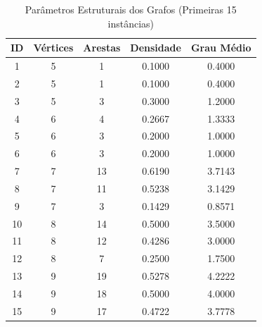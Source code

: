 \begin{table}
\centering
\caption{Parâmetros Estruturais dos Grafos (Primeiras 15 instâncias)}
\label{tab:parametros_grafos_2}
\begin{tabular}{ccccc}
\toprule
ID & Vértices & Arestas & Densidade & Grau Médio \\
\midrule
1 & 5 & 1 & 0.1000 & 0.4000 \\
2 & 5 & 1 & 0.1000 & 0.4000 \\
3 & 5 & 3 & 0.3000 & 1.2000 \\
4 & 6 & 4 & 0.2667 & 1.3333 \\
5 & 6 & 3 & 0.2000 & 1.0000 \\
6 & 6 & 3 & 0.2000 & 1.0000 \\
7 & 7 & 13 & 0.6190 & 3.7143 \\
8 & 7 & 11 & 0.5238 & 3.1429 \\
9 & 7 & 3 & 0.1429 & 0.8571 \\
10 & 8 & 14 & 0.5000 & 3.5000 \\
11 & 8 & 12 & 0.4286 & 3.0000 \\
12 & 8 & 7 & 0.2500 & 1.7500 \\
13 & 9 & 19 & 0.5278 & 4.2222 \\
14 & 9 & 18 & 0.5000 & 4.0000 \\
15 & 9 & 17 & 0.4722 & 3.7778 \\
\bottomrule
\end{tabular}
\end{table}

